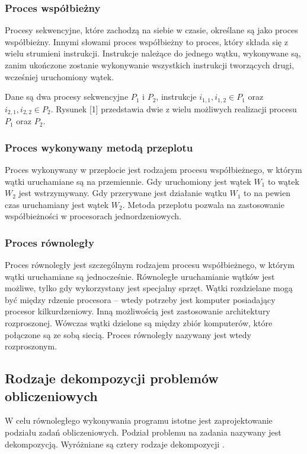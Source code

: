 \documentclass[12pt]{article}
\begin{document}
\subsubsection{Proces współbieżny}
Procesy sekwencyjne, które zachodzą na siebie w czasie, określane są jako proces współbieżny. Innymi słowami
proces współbieżny to proces, który składa się z wielu strumieni instrukcji.
Instrukcje należące do jednego wątku, wykonywane są, zanim ukończone zostanie wykonywanie
wszystkich instrukcji tworzących drugi, wcześniej uruchomiony wątek.

Dane są dwa procesy sekwencyjne $P_1$ i $P_2$, instrukcje $i_{1,1}, i_{1,2} \in P_1$ oraz $i_{2,1}, i_{2,2} \in P_2$.
Rysunek [1] przedstawia dwie z wielu możliwych realizacji procesu $P_1$ oraz $P_2$.

\subsubsection{Proces wykonywany metodą przeplotu}
Proces wykonywany w przeplocie jest rodzajem procesu współbieżnego, w którym wątki uruchamiane są na przemiennie. Gdy uruchomiony
jest wątek $W_1$ to wątek $W_2$ jest wstrzymywany. Gdy przerywane jest działanie wątku $W_1$ to na pewien czas uruchamiany
jest wątek $W_2$. Metoda przeplotu pozwala na zastosowanie współbieżności w procesorach jednordzeniowych.

\subsubsection{Proces równoległy}
Proces równoległy jest szczególnym rodzajem procesu współbieżnego, w którym wątki uruchamiane są jednocześnie. Równoległe uruchamianie
wątków jest możliwe, tylko gdy wykorzystany jest specjalny sprzęt. Wątki rozdzielane mogą być między rdzenie procesora -- wtedy potrzeby
jest komputer posiadający procesor kilkurdzeniowy. Inną możliwością jest zastosowanie architektury rozproszonej. Wówczas wątki dzielone są
między zbiór komputerów, które połączone są ze sobą siecią. Proces równoległy nazywany jest wtedy rozproszonym.

\subsection{Rodzaje dekompozycji problemów obliczeniowych}
W celu równoległego wykonywania programu istotne jest zaprojektowanie podziału zadań obliczeniowych. Podział problemu na
zadania nazywany jest dekompozycją. Wyróżniane są cztery rodzaje dekompozycji \cite{wprowadzenie-do-obliczen-rownoleglych}.
\end{document}
